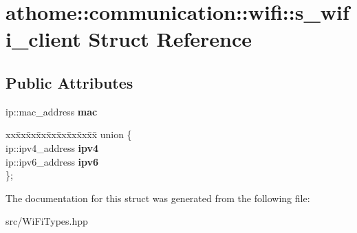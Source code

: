 \hypertarget{structathome_1_1communication_1_1wifi_1_1s__wifi__client}{}\section{athome\+:\+:communication\+:\+:wifi\+:\+:s\+\_\+wifi\+\_\+client Struct Reference}
\label{structathome_1_1communication_1_1wifi_1_1s__wifi__client}
\subsection*{Public Attributes}
\begin{DoxyCompactItemize}
\item 
\mbox{\label{structathome_1_1communication_1_1wifi_1_1s__wifi__client_a47f84e7a3151ffbd74d4c92a5aa74f2d}} 
ip\+::mac\+\_\+address {\bfseries mac}
\item 
\mbox{\label{structathome_1_1communication_1_1wifi_1_1s__wifi__client_a0fc3a6574b5350548c665c79adce737f}} 
\begin{tabbing}
xx\=xx\=xx\=xx\=xx\=xx\=xx\=xx\=xx\=\kill
union \{\\
\>ip::ipv4\_address {\bfseries ipv4}\\
\>ip::ipv6\_address {\bfseries ipv6}\\
\}; \\

\end{tabbing}\end{DoxyCompactItemize}


The documentation for this struct was generated from the following file\+:\begin{DoxyCompactItemize}
\item 
src/Wi\+Fi\+Types.\+hpp\end{DoxyCompactItemize}
